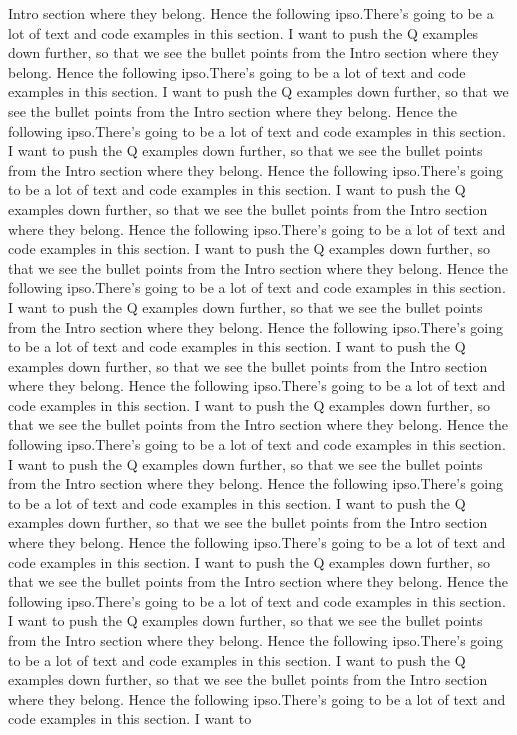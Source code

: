 \documentclass[preprint]{sigplanconf}
\begin{document}
Intro section where they belong.  Hence the following ipso.There's going to be a
lot of text and code examples in this section.  I want to
push the Q examples down further, so that we see the bullet points from the
Intro section where they belong.  Hence the following ipso.There's going to be a
lot of text and code examples in this section.  I want to
push the Q examples down further, so that we see the bullet points from the
Intro section where they belong.  Hence the following ipso.There's going to be a
lot of text and code examples in this section.  I want to
push the Q examples down further, so that we see the bullet points from the
Intro section where they belong.  Hence the following ipso.There's going to be a
lot of text and code examples in this section.  I want to
push the Q examples down further, so that we see the bullet points from the
Intro section where they belong.  Hence the following ipso.There's going to be a
lot of text and code examples in this section.  I want to
push the Q examples down further, so that we see the bullet points from the
Intro section where they belong.  Hence the following ipso.There's going to be a
lot of text and code examples in this section.  I want to
push the Q examples down further, so that we see the bullet points from the
Intro section where they belong.  Hence the following ipso.There's going to be a
lot of text and code examples in this section.  I want to
push the Q examples down further, so that we see the bullet points from the
Intro section where they belong.  Hence the following ipso.There's going to be a
lot of text and code examples in this section.  I want to
push the Q examples down further, so that we see the bullet points from the
Intro section where they belong.  Hence the following ipso.There's going to be a
lot of text and code examples in this section.  I want to
push the Q examples down further, so that we see the bullet points from the
Intro section where they belong.  Hence the following ipso.There's going to be a
lot of text and code examples in this section.  I want to
push the Q examples down further, so that we see the bullet points from the
Intro section where they belong.  Hence the following ipso.There's going to be a
lot of text and code examples in this section.  I want to
push the Q examples down further, so that we see the bullet points from the
Intro section where they belong.  Hence the following ipso.There's going to be a
lot of text and code examples in this section.  I want to
push the Q examples down further, so that we see the bullet points from the
Intro section where they belong.  Hence the following ipso.There's going to be a
lot of text and code examples in this section.  I want to
push the Q examples down further, so that we see the bullet points from the
Intro section where they belong.  Hence the following ipso.There's going to be a
lot of text and code examples in this section.  I want to
\end{document}
